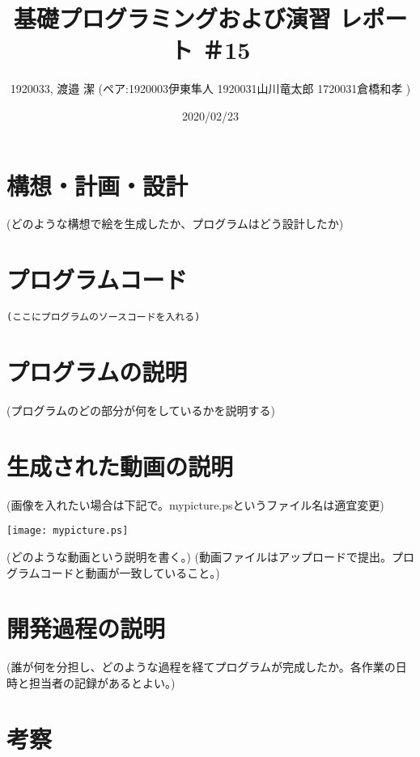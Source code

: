 \documentclass[12pt,a4j]{jarticle}
\begin{document}
\title{基礎プログラミングおよび演習 レポート ＃15}
\author{1920033, 渡邉 潔 (ペア:1920003伊東隼人 1920031山川竜太郎 1720031倉橋和孝 )}
\date{2020/02/23}
\maketitle

\section{構想・計画・設計}

(どのような構想で絵を生成したか、プログラムはどう設計したか)

\section{プログラムコード}

\begin{verbatim}
(ここにプログラムのソースコードを入れる)
\end{verbatim}

\section{プログラムの説明}

(プログラムのどの部分が何をしているかを説明する)

\section{生成された動画の説明}

(画像を入れたい場合は下記で。mypicture.psというファイル名は適宜変更)
\begin{center}
\texttt{[image: mypicture.ps]}
\end{center}

(どのような動画という説明を書く。)
(動画ファイルはアップロードで提出。プログラムコードと動画が一致していること。)

\section{開発過程の説明}

(誰が何を分担し、どのような過程を経てプログラムが完成したか。各作業の日時と担当者の記録があるとよい。)

\section{考察}
\end{document}
